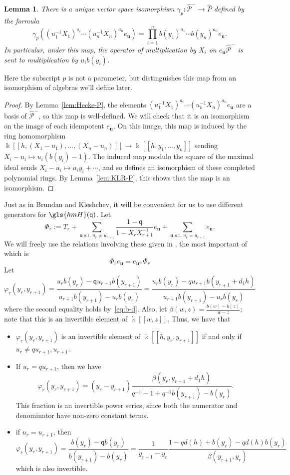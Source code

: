 \documentclass[10pt]{article}
\newtheorem{lemma}[theorem]{Lemma}
\theoremstyle{definition}
\newcommand{\pq}{\mathsf{q}}
\newcommand{\K}{\Bbbk}%
\newcommand{\Bu}{\mathbf{u}}
\newcommand{\cP}{\mathcal{P}}
\newcommand{\hmH}{\gls{hmH}}
\newcommand{\hcP}{\widehat{\cP}}
\newcommand{\hP}{\widehat{P}}
\newcommand\llbracket{[\![}
\newcommand\rrbracket{]\!]}
\begin{document}
\begin{lemma}\label{lem:gammap}
 There is a unique 
vector space isomorphism $\gamma_p\colon \hcP^-\to \hP$ defined by the formula
\begin{equation}
 \gamma_p((u_1^{-1}X_1)^{a_i}\cdots (u_n^{-1}X_n)^{a_n}e_{\Bu})=
\prod_{i=1}^nb(y_1)^{a_1}\cdots b(y_n)^{a_n}e_{\Bu}.\label{eq:poly-map}
\end{equation}
 In particular, under this map, the operator of multiplication by $X_i$ on
 $e_{\Bu} \hcP^-$ is sent to multiplication by $u_ib(y_i)$. 
\end{lemma}Here the subscript $p$ is not a parameter, but
 distinguishes this map from an isomorphism of algebras we'll define
 later.
 \begin{proof}
 By Lemma~\ref{lem:Hecke-P}, the elements
 $(u_1^{-1}X_1)^{a_i}\cdots (u_n^{-1}X_n)^{a_n}e_{\Bu}$ are a basis
 of $\hcP^-$, so this map is well-defined. We will check that it
 is an isomorphism on the image of each idempotent $e_{\Bu}$. On
 this image, this map is induced by the ring homomorphism
 $\K\llbracket h,(X_1-u_1),\dots, (X_n-u_n)\rrbracket \to \K\llbracket h,y_1,\dots,y_n\rrbracket $
 sending $X_i-u_i\mapsto u_i(b(y_i)-1)$. The induced map modulo
 the square of the maximal ideal sends $X_i-u_i\mapsto
 u_iy_i+\cdots$, and so defines an isomorphism of these completed
 polynomial rings.
 By Lemma~\ref{lem:KLR-P}, this shows that
 the map is an isomorphism.
 \end{proof}
 Just as in Brundan and Kleshchev, it will be convenient for us to
 use different generators for $\hmH(\pq)$. Let \[\Phi_r:=
 T_r+\sum_{\Bu\text{ s.t. }u_r\neq
 u_{r+1}}\frac{1-\pq}{1-X_rX_{r+1}^{-1}}e_{\Bu}+\sum_{\Bu\text{ s.t. }u_r=
 u_{r+1}}e_{\Bu}.
 \]
We will freely use the relations involving these given in
\cite[Lem.~4.1]{BKKL}, the most important of which is 
\begin{equation}
\Phi_r e_{\Bu}=e_{\Bu^{s_r}}\Phi_r\label{eq:Phi-e}
\end{equation}
Let \[\varphi_r(y_r,y_{r+1})=\frac{u_rb(y_r)-\pq
 u_{r+1}b(y_{r+1})}{u_{r+1}b(y_{r+1}) -u_rb(y_r)}=\frac{u_rb(y_r)-q
 u_{r+1}b(y_{r+1}+d_1h)}{u_{r+1}b(y_{r+1}) -u_rb(y_r)} \]
where the second equality holds by~\eqref{eq:b-d}. Also, let
$\beta(w,z)=\frac{b(w)-b(z)}{w-z};$ note that this is an invertible
element of $\K\llbracket w,z\rrbracket $. 
Thus, we have that 
\begin{itemize}
\item $\varphi_r(y_r,y_{r+1})$ is an invertible element of 
 $\K\llbracket h,y_r,y_{r+1}\rrbracket $ if and only if $u_r\neq qu_{r+1},u_{r+1}$. 
\item If
 $u_r= qu_{r+1}$, then we have \[\varphi_r(y_r,y_{r+1})=(y_r-y_{r+1})\frac{\beta(y_r,y_{r+1}+d_1h)}{q^{-1} -1+q^{-1}b(y_{r+1}) -b(y_r)}.\]
 This fraction is an invertible power series, since both the numerator
 and denominator have non-zero constant terms.
\item if $u_r=u_{r+1}$,
 then \[\varphi_r(y_r,y_{r+1})=\frac{b(y_r)-\pq b(y_r)}{b(y_{r+1})
 -b(y_r)}=\frac{1}{y_{r+1}
 -y_r}\frac{1-qd(h)+b(y_r)-qd(h)b(y_r)}{\beta(y_{r+1} ,y_r)}\]
 which is also invertible. 
\end{itemize}
\end{document}
